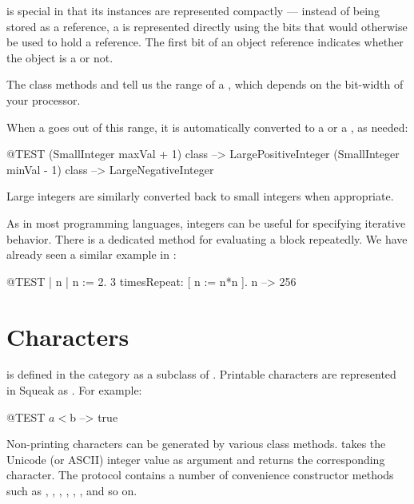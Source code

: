 \documentclass[a4paper,10pt,twoside]{book}
\begin{document}
 is special in that its instances are represented compactly --- instead of being stored as a reference, a  is represented directly using the bits that would otherwise be used to hold a reference.
The first bit of an object reference indicates whether the object is a  or not.

The class methods  and  tell us the range of a , which depends on the bit-width of your processor.

When a  goes out of this range, it is automatically converted to a  or a , as needed:

\begin{code}{@TEST}
(SmallInteger maxVal + 1) class --> LargePositiveInteger
(SmallInteger minVal - 1) class  --> LargeNegativeInteger
\end{code}

Large integers are similarly converted back to small integers when appropriate.

As in most programming languages, integers can be useful for specifying iterative behavior.
There is a dedicated method  for evaluating a block repeatedly.
We have already seen a similar example in :
\begin{code}{@TEST | n |}
n := 2.
3 timesRepeat: [ n := n*n ].
n --> 256
\end{code}

\section{Characters}

 is defined in the  category as a subclass of .
Printable characters are represented in Squeak as .
For example:

\begin{code}{@TEST}
$a < $b --> true
\end{code}

Non-printing characters can be generated by various class methods.
\mbox{} takes the Unicode (or ASCII) integer value as argument and returns the corresponding character.
The protocol  contains a number of convenience constructor methods such as , , , , , , and so on.
\end{document}
